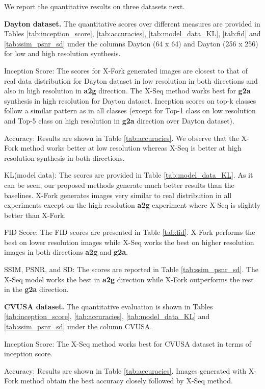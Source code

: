 \documentclass[times,twocolumn,final,authoryear]{elsarticle_modified}
\begin{document}
We report the quantitative results on three datasets next. 

\noindent \textbf{Dayton dataset.} The quantitative scores over different measures are provided in Tables \ref{tab:inception_score}, \ref{tab:accuracies}, \ref{tab:model_data_KL}, \ref{tab:fid} and \ref{tab:ssim_psnr_sd} under the columns Dayton (64 x 64) and Dayton (256 x 256) for low and high resolution synthesis. 


Inception Score: The scores for X-Fork generated images are closest to that of real data distribution for Dayton dataset in low resolution in both directions and also in high resolution in \textbf{a2g} direction. The X-Seq method works best for \textbf{g2a} synthesis in high resolution for Dayton dataset. Inception scores on top-k classes follow a similar pattern as in all classes (except for Top-1 class on low resolution and Top-5 class on high resolution in \textbf{g2a} direction over Dayton dataset).

Accuracy: Results are shown in Table \ref{tab:accuracies}. We observe that the X-Fork method works better at low resolution whereas X-Seq is better at high resolution synthesis in both directions.

KL(model  data):
The scores are provided in Table \ref{tab:model_data_KL}. As it can be seen, our proposed methods generate much better results than the baselines. X-Fork generates images very similar to real distribution in all experiments except on the high resolution \textbf{a2g} experiment where X-Seq is slightly better than X-Fork. 

{FID Score:} The FID scores are presented in Table \ref{tab:fid}. X-Fork performs the best on lower resolution images while X-Seq works the best on higher resolution images in both directions \textbf{a2g} and \textbf{g2a}.  


{SSIM, PSNR, and SD:}
The scores are reported in Table \ref{tab:ssim_psnr_sd}. The X-Seq model works the best in \textbf{a2g} direction while X-Fork outperforms the rest in the \textbf{g2a} direction.

\noindent \textbf{CVUSA dataset.} The quantitative evaluation is shown in Tables \ref{tab:inception_score}, \ref{tab:accuracies}, \ref{tab:model_data_KL} and \ref{tab:ssim_psnr_sd} under the column CVUSA. 


Inception Score: The X-Seq method works best for CVUSA dataset in terms of inception score.

Accuracy: Results are shown in Table \ref{tab:accuracies}. Images generated with X-Fork method obtain the best accuracy closely followed by X-Seq method.
\end{document}
